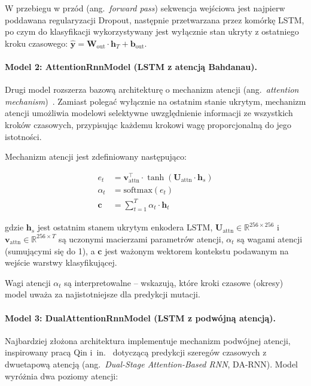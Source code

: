 W przebiegu w przód (ang.~\emph{forward pass}) sekwencja wejściowa jest najpierw poddawana regularyzacji Dropout, następnie przetwarzana przez komórkę LSTM, po czym do klasyfikacji wykorzystywany jest wyłącznie stan ukryty z ostatniego kroku czasowego: $\hat{\mathbf{y}} = \mathbf{W}_{\text{out}} \cdot \mathbf{h}_T + \mathbf{b}_{\text{out}}$.

\vspace{0.5cm}

\paragraph{Model 2: AttentionRnnModel (LSTM z atencją Bahdanau).}
Drugi model rozszerza bazową architekturę o mechanizm atencji (ang.~\emph{attention mechanism})~\cite{bahdanau2015attention}. Zamiast polegać wyłącznie na ostatnim stanie ukrytym, mechanizm atencji umożliwia modelowi selektywne uwzględnienie informacji ze wszystkich kroków czasowych, przypisując każdemu krokowi wagę proporcjonalną do jego istotności.

Mechanizm atencji jest zdefiniowany następująco:

\begin{align}
e_t &= \mathbf{v}_{\text{attn}}^{\top} \cdot \tanh\left(\mathbf{U}_{\text{attn}} \cdot \mathbf{h}_s\right) \label{eq:attn-energy} \\
\alpha_t &= \text{softmax}(e_t) \label{eq:attn-weights} \\
\mathbf{c} &= \sum_{t=1}^{T} \alpha_t \cdot \mathbf{h}_t \label{eq:attn-context}
\end{align}

\noindent gdzie $\mathbf{h}_s$ jest ostatnim stanem ukrytym enkodera LSTM, $\mathbf{U}_{\text{attn}} \in \mathbb{R}^{256 \times 256}$ i $\mathbf{v}_{\text{attn}} \in \mathbb{R}^{256 \times T}$ są uczonymi macierzami parametrów atencji, $\alpha_t$ są wagami atencji (sumującymi się do 1), a $\mathbf{c}$ jest ważonym wektorem kontekstu podawanym na wejście warstwy klasyfikującej.

Wagi atencji $\alpha_t$ są interpretowalne -- wskazują, które kroki czasowe (okresy) model uważa za najistotniejsze dla predykcji mutacji.

\vspace{0.5cm}

\paragraph{Model 3: DualAttentionRnnModel (LSTM z podwójną atencją).}
Najbardziej złożona architektura implementuje mechanizm podwójnej atencji, inspirowany pracą Qin i~in.~\cite{qin2017darnn} dotyczącą predykcji szeregów czasowych z dwuetapową atencją (ang.~\emph{Dual-Stage Attention-Based RNN}, DA-RNN). Model wyróżnia dwa poziomy atencji:

